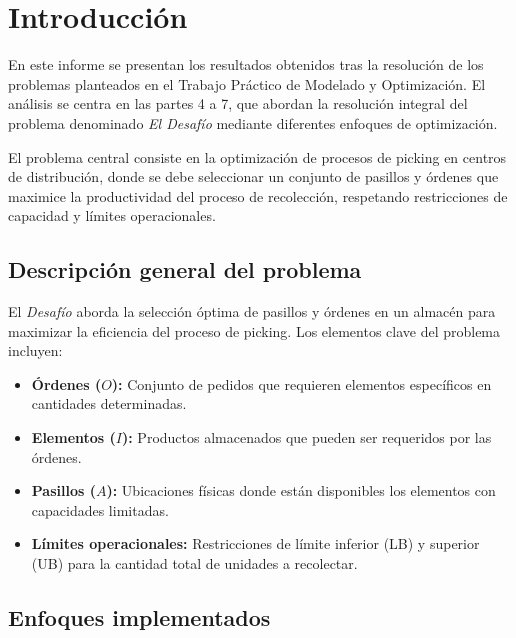 \documentclass[a4paper,12pt]{article}
\begin{document}
\thispagestyle{empty}
\clearpage

\tableofcontents
\clearpage

\section{Introducción}
En este informe se presentan los resultados obtenidos tras la resolución de los problemas planteados en el Trabajo Práctico de Modelado y Optimización. El análisis se centra en las partes 4 a 7, que abordan la resolución integral del problema denominado \textit{El Desafío} mediante diferentes enfoques de optimización.

El problema central consiste en la optimización de procesos de picking en centros de distribución, donde se debe seleccionar un conjunto de pasillos y órdenes que maximice la productividad del proceso de recolección, respetando restricciones de capacidad y límites operacionales.

\subsection*{Descripción general del problema}

El \textit{Desafío} aborda la selección óptima de pasillos y órdenes en un almacén para maximizar la eficiencia del proceso de picking. Los elementos clave del problema incluyen:

\begin{itemize}
    \item \textbf{Órdenes ($O$):} Conjunto de pedidos que requieren elementos específicos en cantidades determinadas.
    \item \textbf{Elementos ($I$):} Productos almacenados que pueden ser requeridos por las órdenes.
    \item \textbf{Pasillos ($A$):} Ubicaciones físicas donde están disponibles los elementos con capacidades limitadas.
    \item \textbf{Límites operacionales:} Restricciones de límite inferior (LB) y superior (UB) para la cantidad total de unidades a recolectar.
\end{itemize}

\subsection*{Enfoques implementados}
\end{document}
